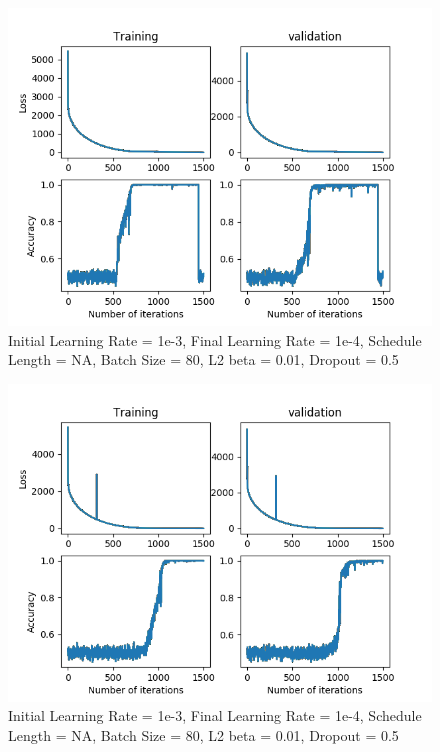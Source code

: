 \documentclass[12pt,reqno]{amsart}
\numberwithin{equation}{section}
\begin{document}
\begin{enumerate}
\begin{figure}[H]
\centering
\includegraphics[scale=0.6]{Commit-test-3}
\caption{Initial Learning Rate = 1e-3, Final Learning Rate = 1e-4, Schedule Length = NA, Batch Size = 80, L2 beta = 0.01, Dropout = 0.5}
\end{figure}

\begin{figure}[H]
\centering
\includegraphics[scale=0.6]{Commit-test-4}
\caption{Initial Learning Rate = 1e-3, Final Learning Rate = 1e-4, Schedule Length = NA, Batch Size = 80, L2 beta = 0.01, Dropout = 0.5}
\end{figure}


\end{enumerate}
\end{document}
